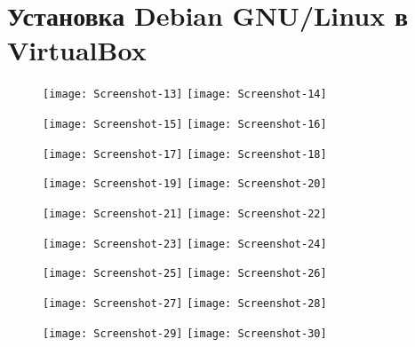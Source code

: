 \section{Установка Debian GNU/Linux в VirtualBox} \label{pril:b}

\begin{figure}[ht]
    \centering
	\texttt{[image: Screenshot-13]}
	\texttt{[image: Screenshot-14]}
\end{figure}

\begin{figure}[ht]
    \centering
	\texttt{[image: Screenshot-15]}
	\texttt{[image: Screenshot-16]}
\end{figure}

\begin{figure}[ht]
    \centering
	\texttt{[image: Screenshot-17]}
	\texttt{[image: Screenshot-18]}
\end{figure}

\begin{figure}[ht]
    \centering
	\texttt{[image: Screenshot-19]}
	\texttt{[image: Screenshot-20]}
\end{figure}

\begin{figure}[ht]
    \centering
	\texttt{[image: Screenshot-21]}
	\texttt{[image: Screenshot-22]}
\end{figure}

\begin{figure}[ht]
    \centering
	\texttt{[image: Screenshot-23]}
	\texttt{[image: Screenshot-24]}
\end{figure}

\begin{figure}[ht]
    \centering
	\texttt{[image: Screenshot-25]}
	\texttt{[image: Screenshot-26]}
\end{figure}


\begin{figure}[ht]
    \centering
	\texttt{[image: Screenshot-27]}
	\texttt{[image: Screenshot-28]}
\end{figure}

\begin{figure}[ht]
    \centering
	\texttt{[image: Screenshot-29]}
	\texttt{[image: Screenshot-30]}
\end{figure}

